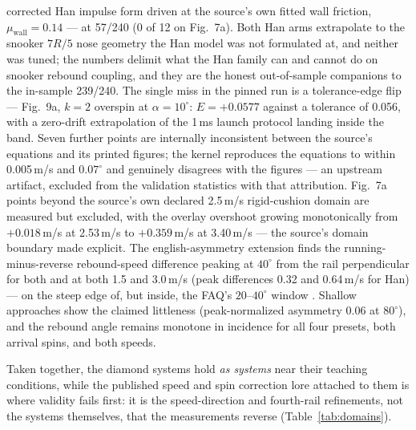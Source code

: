 corrected Han impulse form driven at the source's own fitted wall
friction, $\mu_{\mathrm{wall}} = 0.14$ --- at 57/240 (0 of 12 on
Fig.~7a). Both Han arms extrapolate to the snooker $7R/5$ nose geometry
the Han model was not formulated at, and neither was tuned; the numbers
delimit what the Han family can and cannot do on snooker rebound
coupling, and they are the honest out-of-sample companions to the
in-sample 239/240. The single miss in the pinned run is a tolerance-edge
flip --- Fig.~9a,
$k = 2$ overspin at $\alpha = 10^\circ$: $E = +0.0577$ against a tolerance
of 0.056, with a zero-drift extrapolation of the 1\,ms launch protocol
landing inside the band. Seven
further points are internally inconsistent between the source's equations
and its printed figures; the kernel reproduces the equations to within
0.005\,m/s and $0.07^\circ$ and genuinely disagrees with the figures ---
an upstream artifact, excluded from the validation statistics with that
attribution. Fig.~7a points
beyond the source's own declared 2.5\,m/s rigid-cushion domain are
measured but excluded, with the overlay overshoot growing monotonically
from $+0.018$\,m/s at 2.53\,m/s to $+0.359$\,m/s at 3.40\,m/s --- the
source's domain boundary made explicit. The english-asymmetry extension finds the
running-minus-reverse rebound-speed difference peaking at $40^\circ$ from
the rail perpendicular for both  and
 at both 1.5 and 3.0\,m/s (peak differences 0.32 and
0.64\,m/s for Han) --- on the steep edge of, but inside, the FAQ's
$20$--$40^\circ$ window \citep{alciatore_faq}. Shallow approaches show the
claimed littleness (peak-normalized asymmetry 0.06 at $80^\circ$), and the
rebound angle remains monotone in incidence for all four presets, both
arrival spins, and both speeds.

Taken together, the diamond systems hold \emph{as systems} near their
teaching conditions, while the published speed and spin correction lore
attached to them is where validity fails first: it is the speed-direction
and fourth-rail refinements, not the systems themselves, that the
measurements reverse (Table~\ref{tab:domains}).

